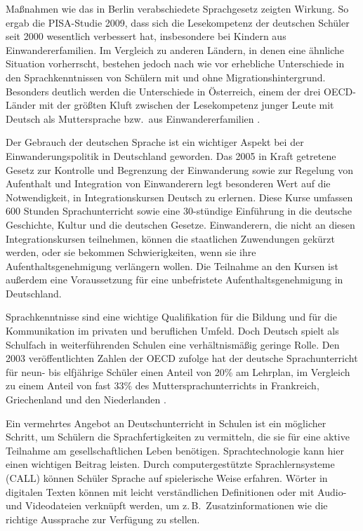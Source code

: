 \begin{multicols}{2}
Maßnahmen wie das in Berlin verabschiedete Sprachgesetz zeigten Wirkung. So ergab die PISA-Studie 2009, dass sich die Lesekompetenz der deutschen Schüler seit 2000 wesentlich verbessert hat, insbesondere bei Kindern aus Einwandererfamilien. Im Vergleich zu anderen Ländern, in denen eine ähnliche Situation vorherrscht, bestehen jedoch nach wie vor erhebliche Unterschiede in den Sprachkenntnissen von Schülern mit und ohne Migrationshintergrund. Besonders deutlich werden die Unterschiede in Österreich, einem der drei OECD-Länder mit der größten Kluft zwischen der Lesekompetenz junger Leute mit Deutsch als Muttersprache bzw.~aus Einwandererfamilien \cite{Pisa1}.

Der Gebrauch der deutschen Sprache ist ein wichtiger Aspekt bei der Einwanderungspolitik in Deutschland geworden. Das 2005 in Kraft getretene Gesetz zur Kontrolle und Begrenzung der Einwanderung sowie zur Regelung von Aufenthalt und Integration von Einwanderern legt besonderen Wert auf die Notwendigkeit, in Integrationskursen Deutsch zu erlernen. Diese Kurse umfassen 600 Stunden Sprachunterricht sowie eine 30-stün\-dige Einführung in die deutsche Geschichte, Kultur und die deutschen Gesetze. Einwanderern, die nicht an diesen Integrationskursen teilnehmen, können die staatlichen Zuwendungen gekürzt werden, oder sie bekommen Schwierigkeiten, wenn sie ihre Aufenthaltsgenehmigung verlängern wollen. Die Teilnahme an den Kursen ist außerdem eine Voraussetzung für eine unbefristete Aufenthaltsgenehmigung in Deutschland.

Sprachkenntnisse sind eine wichtige Qualifikation für die Bildung und für die Kommunikation im privaten und beruflichen Umfeld. Doch Deutsch spielt als Schulfach in weiterführenden Schulen eine verhältnismäßig geringe Rolle. Den 2003 veröffentlichten Zahlen der OECD zufolge hat der deutsche Sprachunterricht für neun- bis elfjährige Schüler einen Anteil von 20\% am Lehrplan, im Vergleich zu einem Anteil von fast 33\% des Muttersprachunterrichts in Frankreich, Griechenland und den Niederlanden \cite{kmk1}.


Ein vermehrtes Angebot an Deutschunterricht in Schulen ist ein möglicher Schritt, um Schülern die Sprachfertigkeiten zu vermitteln, die sie für eine aktive Teilnahme am gesellschaftlichen Leben benötigen. Sprachtechnologie kann hier einen wichtigen Beitrag leisten. Durch computergestützte Sprachlernsysteme (CALL) können Schüler Sprache auf spielerische Weise erfahren. Wörter in digitalen Texten können mit leicht verständlichen Definitionen oder mit Audio- und Videodateien verknüpft werden, um z.\,B.~Zusatzinformationen wie die richtige Aussprache zur Verfügung zu stellen.


\end{multicols}

